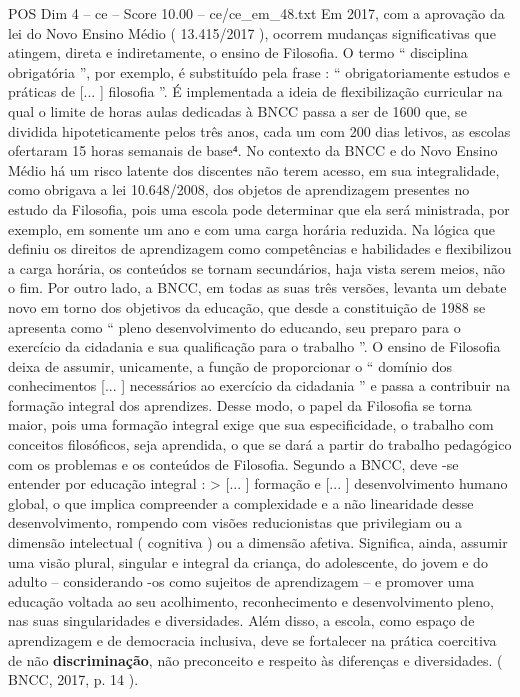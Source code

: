\begin{textsample}{POS Dim 4 – ce – Score 10.00 – ce/ce\_em\_48.txt}
Em 2017, com a aprovação da lei do Novo Ensino Médio ( 13.415/2017 ), ocorrem mudanças significativas que atingem, direta e indiretamente, o ensino de Filosofia.
O termo “ disciplina obrigatória ”, por exemplo, é substituído pela frase : “ obrigatoriamente estudos e práticas de [... ] filosofia ”.
É implementada a ideia de flexibilização curricular na qual o limite de horas aulas dedicadas à BNCC passa a ser de 1600 que, se dividida hipoteticamente pelos três anos, cada um com 200 dias letivos, as escolas ofertaram 15 horas semanais de base⁴.
No contexto da BNCC e do Novo Ensino Médio há um risco latente dos discentes não terem acesso, em sua integralidade, como obrigava a lei 10.648/2008, dos objetos de aprendizagem presentes no estudo da Filosofia, pois uma escola pode determinar que ela será ministrada, por exemplo, em somente um ano e com uma carga horária reduzida.
Na lógica que definiu os direitos de aprendizagem como competências e habilidades e flexibilizou a carga horária, os conteúdos se tornam secundários, haja vista serem meios, não o fim.
Por outro lado, a BNCC, em todas as suas três versões, levanta um debate novo em torno dos objetivos da educação, que desde a constituição de 1988 se apresenta como “ pleno desenvolvimento do educando, seu preparo para o exercício da cidadania e sua qualificação para o trabalho ”.
O ensino de Filosofia deixa de assumir, unicamente, a função de proporcionar o “ domínio dos conhecimentos [... ] necessários ao exercício da cidadania ” e passa a contribuir na formação integral dos aprendizes.
Desse modo, o papel da Filosofia se torna maior, pois uma formação integral exige que sua especificidade, o trabalho com conceitos filosóficos, seja aprendida, o que se dará a partir do trabalho pedagógico com os problemas e os conteúdos de Filosofia.
Segundo a BNCC, deve -se entender por educação integral : > [... ] formação e [... ] desenvolvimento humano global, o que implica compreender a complexidade e a não linearidade desse desenvolvimento, rompendo com visões reducionistas que privilegiam ou a dimensão intelectual ( cognitiva ) ou a dimensão afetiva.
Significa, ainda, assumir uma visão plural, singular e integral da criança, do adolescente, do jovem e do adulto – considerando -os como sujeitos de aprendizagem – e promover uma educação voltada ao seu acolhimento, reconhecimento e desenvolvimento pleno, nas suas singularidades e diversidades.
Além disso, a escola, como espaço de aprendizagem e de democracia inclusiva, deve se fortalecer na prática coercitiva de não \textbf{discriminação}, não preconceito e respeito às diferenças e diversidades. ( BNCC, 2017, p. 14 ).

\end{textsample}
